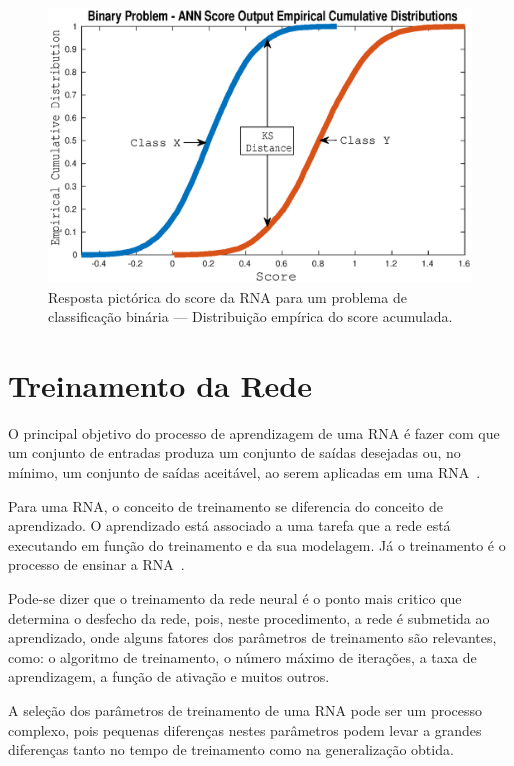 \begin{figure}[H]
\centering
\includegraphics[width=1\textwidth]{figuras/ANNScore_Output_Cumulative.eps}
\caption{Resposta pictórica do score da RNA para um problema de classificação binária --- Distribuição empírica do score acumulada.}
\label{fig:ANN_Distribution_b}
\end{figure}

\section{Treinamento da Rede}

O principal objetivo do processo de aprendizagem de uma RNA é fazer com que um conjunto de entradas produza um conjunto de saídas desejadas ou, no mínimo, um conjunto de saídas aceitável, ao serem aplicadas em uma RNA~\cite{haykin2007redes}.

Para uma RNA, o conceito de treinamento se diferencia do conceito de aprendizado. O aprendizado está associado a uma tarefa que a rede está executando em função do treinamento e da sua modelagem. Já o treinamento é o processo de ensinar a RNA~\cite{furtado2019redes}.

Pode-se dizer que o treinamento da rede neural é o ponto mais critico que determina o desfecho da rede, pois, neste procedimento, a rede é submetida ao aprendizado, onde alguns fatores dos parâmetros de treinamento são relevantes, como: o algoritmo de treinamento, o número máximo de iterações, a taxa de aprendizagem, a função de ativação e muitos outros.

A seleção dos parâmetros de treinamento de uma RNA pode ser um processo complexo, pois pequenas diferenças nestes parâmetros podem levar a grandes diferenças tanto no tempo de treinamento como na generalização obtida.

